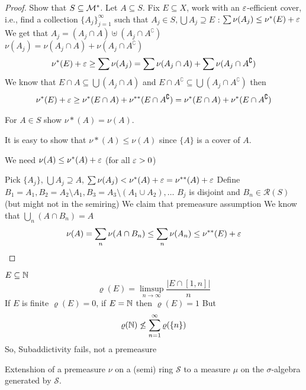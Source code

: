 \begin{proof}
  Show that $S \subseteq \mathcal M^*$. Let $A \subseteq S$. 
  Fix $E \subseteq X$, work with an $\varepsilon$-efficient cover, i.e.,
  find a collection $\{A_j\}_{j=1}^\infty$ such that $A_j \in S, \bigcup A_j \supseteq E$ : 
  $\sum \nu(A_j) \le \nu^*(E) + \varepsilon$
  We get that $A_j = (A_j \cap A) \uplus (A_j \cap A^\complement)$
  $\nu(A_j) = \nu(A_j \cap A) + \nu(A_j \cap A^\complement)$
  \[\nu^*(E) + \varepsilon \ge \sum \nu(A_j) = \sum \nu(A_j \cap A) + \sum \nu(A_j \cap A^\complement) \]
  We know that $E \cap A \subseteq \bigcup (A_j \cap A)$ and $E \cap A^\complement \subseteq \bigcup (A_j \cap A^\complement)$
  then 
  \begin{align*}
   \nu^*(E) + \varepsilon \ge \nu^*(E \cap A) + \nu^{**}(E \cap A^\complement) = \nu^*(E \cap A) + \nu^*(E \cap A^\complement)
  \end{align*}

  For $A \in S$ show $\nu*(A) = \nu(A)$.

  It is easy to show that $\nu*(A) \le \nu(A)$ since $\{A\}$ is a cover of $A$.

  We need $\nu(A) \le \nu^*(A) + \varepsilon$ (for all $\varepsilon > 0$)

  Pick $\{A_j\}$, $\bigcup A_j \supseteq A$, $\sum \nu(A_j) < \nu^*(A) + \varepsilon = \nu^{**}(A) + \varepsilon$
  Define $B_1 = A_1, B_2 = A_2 \setminus A_1, B_3 = A_3 \setminus (A_1 \cup A_2), \dotsc$ $B_j$ is disjoint and $B_n \in \mathcal{R}(S)$ (but might not in the semiring)
  We claim that premeasure assumption
  We know that $\bigcup_n (A \cap B_n) = A$
  \[\nu(A) = \sum_n \nu(A\cap B_n) \le \sum_n \nu(A_n) \le \nu^{**}(E) + \varepsilon\]
\end{proof}

\begin{example}
  $E \subseteq \mathbb N$ 
  \[\varrho(E) = \limsup_{n\to\infty} \frac{|E \cap [1, n]|}n\]
  If $E$ is finite $\varrho(E) = 0$, if $E = \mathbb N$ then $\varrho(E) = 1$
  But 
  \[\varrho(\mathbb N) \not\le \sum_{n=1}^\infty \varrho(\{n\})\]
  So, Subaddictivity fails, not a premeasure
\end{example}

Extenshion of a premeasure $\nu$ on a (semi) ring $\mathcal{S}$
to a measure $\mu$ on the $\sigma$-algebra generated by $\mathcal{S}$.

